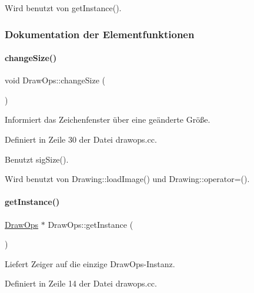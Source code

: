 Wird benutzt von get\+Instance().



\subsubsection{Dokumentation der Elementfunktionen}
\mbox{\label{classDrawOps_a4c0713f93d8f4131ff00e462d501c055}} 
\paragraph{\texorpdfstring{change\+Size()}{changeSize()}}
{\footnotesize\ttfamily void Draw\+Ops\+::change\+Size (\begin{DoxyParamCaption}{ }\end{DoxyParamCaption})}



Informiert das Zeichenfenster über eine geänderte Größe. 



Definiert in Zeile 30 der Datei drawops.\+cc.



Benutzt sig\+Size().



Wird benutzt von Drawing\+::load\+Image() und Drawing\+::operator=().

\mbox{\label{classDrawOps_a2f59844de416f8d3ca4a2a63ccefb0cd}} 
\paragraph{\texorpdfstring{get\+Instance()}{getInstance()}}
{\footnotesize\ttfamily \mbox{\hyperlink{classDrawOps}{Draw\+Ops}} $\ast$ Draw\+Ops\+::get\+Instance (\begin{DoxyParamCaption}{ }\end{DoxyParamCaption})\hspace{0.3cm}{\ttfamily [static]}}



Liefert Zeiger auf die einzige Draw\+Ops-\/\+Instanz. 



Definiert in Zeile 14 der Datei drawops.\+cc.



